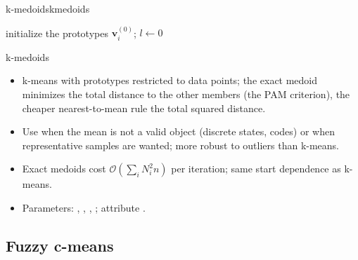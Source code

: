\begin{algobox}{k-medoids}{kmedoids}
\begin{algorithm}[H]
initialize the prototypes $\mathbf{v}_i^{(0)}$; $l\leftarrow0$\;
\end{algorithm}
\end{algobox}
\begin{summarybox}{k-medoids}
\begin{itemize}
  \item k-means with prototypes restricted to data points; the exact medoid minimizes the total distance to the other members (the PAM criterion), the cheaper nearest-to-mean rule the total squared distance.
  \item Use when the mean is not a valid object (discrete states, codes) or when representative samples are wanted; more robust to outliers than k-means.
  \item Exact medoids cost $\mathcal{O}(\sum_i N_i^2 n)$ per iteration; same start dependence as k-means.
  \item Parameters: , , , ; attribute .
\end{itemize}
\end{summarybox}

\subsection{Fuzzy c-means}\label{sec:part:fcm}

